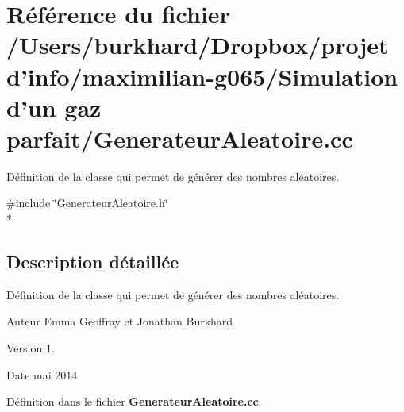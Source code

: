 \section{Référence du fichier /\+Users/burkhard/\+Dropbox/projet d'info/maximilian-\/g065/\+Simulation d'un gaz parfait/\+Generateur\+Aleatoire.cc}
\label{_generateur_aleatoire_8cc}


Définition de la classe qui permet de générer des nombres aléatoires.  


{\ttfamily \#include \char`\"{}Generateur\+Aleatoire.\+h\char`\"{}}\\*


\subsection{Description détaillée}
Définition de la classe qui permet de générer des nombres aléatoires. 

\begin{DoxyAuthor}{Auteur}
Emma Geoffray et Jonathan Burkhard 
\end{DoxyAuthor}
\begin{DoxyVersion}{Version}
1. 
\end{DoxyVersion}
\begin{DoxyDate}{Date}
mai 2014 
\end{DoxyDate}


Définition dans le fichier {\bf Generateur\+Aleatoire.\+cc}.

